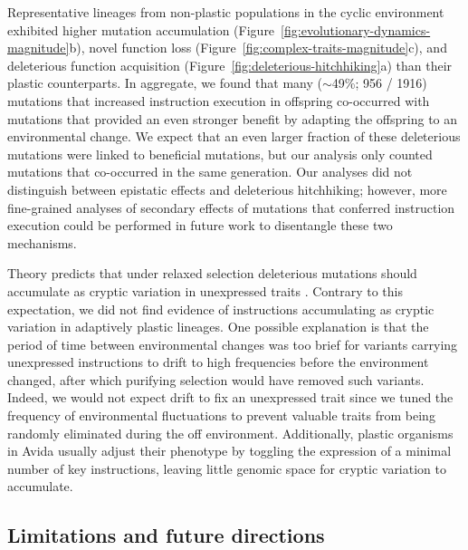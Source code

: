 \begin{raggedbottom}
Representative lineages from non-plastic populations in the cyclic environment exhibited higher mutation accumulation (Figure~\ref{fig:evolutionary-dynamics-magnitude}b), novel function loss (Figure~\ref{fig:complex-traits-magnitude}c), and deleterious function acquisition (Figure~\ref{fig:deleterious-hitchhiking}a) than their plastic counterparts.
In aggregate, we found that many ($\sim$49\%; 956 / 1916) mutations that increased  instruction execution in offspring co-occurred with mutations that provided an even stronger benefit by adapting the offspring to an environmental change.
We expect that an even larger fraction of these deleterious mutations were linked to beneficial mutations, but our analysis only counted mutations that co-occurred in the same generation.
Our analyses did not distinguish between epistatic effects and deleterious hitchhiking; however, more fine-grained analyses of secondary effects of mutations that conferred  instruction execution could be performed in future work to disentangle these two mechanisms.


Theory predicts that under relaxed selection deleterious mutations should accumulate as cryptic variation in unexpressed traits \citep{lahti_relaxed_2009}.
Contrary to this expectation, we did not find evidence of  instructions accumulating as cryptic variation in adaptively plastic lineages.
One possible explanation is that the period of time between environmental changes was too brief for variants carrying unexpressed  instructions to drift to high frequencies before the environment changed, after which purifying selection would have removed such variants.
Indeed, we would not expect drift to fix an unexpressed trait since we tuned the frequency of environmental fluctuations to prevent valuable traits from being randomly eliminated during the off environment.
Additionally, plastic organisms in Avida usually adjust their phenotype by toggling the expression of a minimal number of key instructions, leaving little genomic space for cryptic variation to accumulate.

\subsection{Limitations and future directions}


\end{raggedbottom}

